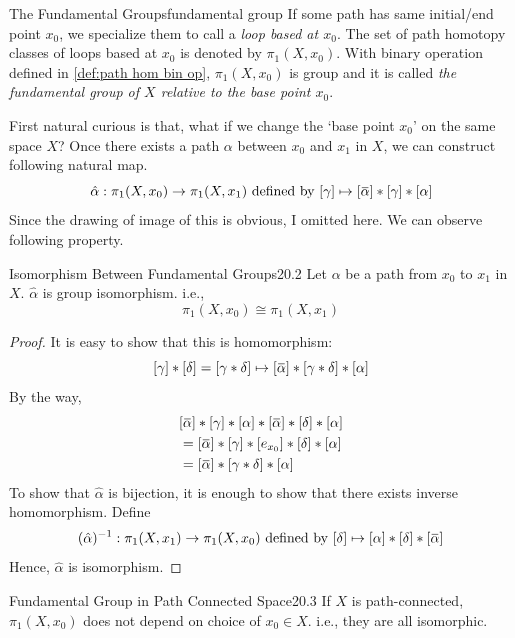 \documentclass[12pt, a4paper, twoside]{article}
\newcommand{\overbar}[1]{\mkern 1.5mu\overline{\mkern-1.5mu#1\mkern-1.5mu}\mkern 1.5mu}
\theoremstyle{plain}
\begin{document}
\begin{defn}{The Fundamental Groups}{fundamental group}
    If some path has same initial/end point $x_0$, we specialize them to call a \textit{loop based at $x_0$}.
    The set of path homotopy classes of loops based at $x_0$ is denoted by $\pi_1(X, x_0)$. 
    With binary operation defined in \ref{def:path hom bin op}, $\pi_1(X, x_0)$ is group and it is called 
    \textit{the fundamental group of $X$ relative to the base point $x_0$}. 
\end{defn}

First natural curious is that, what if we change the \lq base point $x_0$' on the same space $X$? 
Once there exists a path $\alpha$ between $x_0$ and $x_1$ in $X$, we can construct following natural map. 
\[\hat{\alpha}: \pi_1(X, x_0) \rightarrow \pi_1(X, x_1) \text{ defined by } [\gamma] \mapsto [\overbar{\alpha}] * [\gamma] * [\alpha]\]
Since the drawing of image of this is obvious, I omitted here. We can observe following property. 

\begin{prop}{Isomorphism Between Fundamental Groups}{20.2}
    Let $\alpha$ be a path from $x_0$ to $x_1$ in $X$. $\hat{\alpha}$ is group isomorphism. i.e., 
    \[\pi_1(X, x_0) \cong \pi_1(X, x_1)\]
\end{prop}

\begin{proof}
    It is easy to show that this is homomorphism: 
    \[[\gamma] * [\delta] = [\gamma * \delta] \mapsto [\overbar{\alpha}] * [\gamma * \delta] * [\alpha]\]
    By the way, 
    \begin{align*} 
        & [\overbar{\alpha}] * [\gamma] * [\alpha] * [\overbar{\alpha}] * [\delta] * [\alpha] \\
        &= [\overbar{\alpha}] * [\gamma] * [e_{x_0}] * [\delta] * [\alpha] \\ 
        &= [\overbar{\alpha}] * [\gamma * \delta] * [\alpha]
    \end{align*}
    To show that $\hat{\alpha}$ is bijection, it is enough to show that there exists inverse homomorphism. 
    Define 
    \[(\hat{\alpha})^{-1}: \pi_1(X, x_1) \rightarrow \pi_1(X, x_0) \text{ defined by } [\delta] \mapsto [\alpha] * [\delta] * [\overbar{\alpha}]\]
    Hence, $\hat{\alpha}$ is isomorphism. 
\end{proof}

\begin{cor}{Fundamental Group in Path Connected Space}{20.3}
    If $X$ is path-connected, $\pi_1(X, x_0)$ does not depend on choice of $x_0 \in X$. i.e., they are all isomorphic. 
\end{cor}
\end{document}
